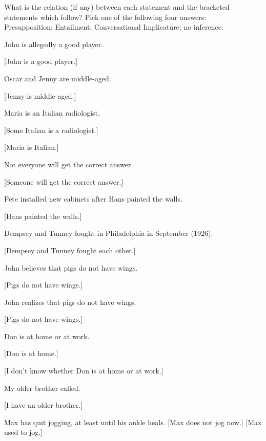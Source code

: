 What is the relation (if any) between each statement and the bracketed statements which follow? Pick one of the following four answers:\\
  Presupposition; Entailment; Conversational Implicature; no inference.

\ea%
    \label{ex:key:1}

          John is allegedly a good player.

{}[John is a good player.]
    \z

\ea%
    \label{ex:key:2}
          Oscar and Jenny are middle-aged.

{}[Jenny is middle-aged.]
    \z

\ea%
    \label{ex:key:3}
          Maria is an Italian radiologist.

\ea {}[Some Italian is a radiologist.]

\ex {}[Maria is Italian.]
    \z \z

\ea%
    \label{ex:key:4}
    Not everyone will get the correct answer.

{}[Someone will get the correct answer.]
    \z

\ea%
    \label{ex:key:5}
    Pete installed new cabinets after Hans painted the walls.

{}[Hans painted the walls.]
    \z

\ea%
    \label{ex:key:6}
          Dempsey and Tunney fought in Philadelphia in  September (1926).

{}[Dempsey and Tunney fought each other.]
    \z

\ea%
    \label{ex:key:7}
          John believes that pigs do not have wings.

{}[Pigs do not have wings.]
    \z

\ea%
    \label{ex:key:8}




          John realizes that pigs do not have wings.

{}[Pigs do not have wings.]
    \z

\ea%
    \label{ex:key:9}
    Don is at home or at work.

\ea {}[Don is at home.]

\ex {}[I don't know whether Don is at home or at work.]
    \z
    \z

\ea%
    \label{ex:key:10}
          My older brother called.

{}[I have an older brother.]
    \z

\ea%
    \label{ex:key:11}




          Max has quit jogging, at least until his ankle heals.
\ea
{}[Max does not jog now.]
\ex
{}[Max used to jog.]
    \z
    \z

